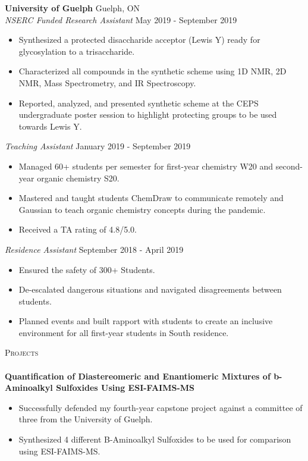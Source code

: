 \documentclass[a4paper]{article}
\newcommand{\lineunder} {
    \vspace*{-8pt} \\
    \hspace*{-18pt} \hrulefill \\
}
\newcommand{\header} [1] {
    {\hspace*{-18pt}\vspace*{6pt} \textsc{#1}}
    \vspace*{-6pt} \lineunder
}
\begin{document}
\textbf{University of Guelph} \hfill Guelph, ON\\
\textit{NSERC Funded Research Assistant} \hfill May 2019 - September 2019\\
\vspace{-1mm}
\begin{itemize} \itemsep 1pt
	\item Synthesized a protected disaccharide acceptor (Lewis Y)          ready for glycosylation to a trisaccharide.
	\item Characterized all compounds in the synthetic scheme using        1D NMR, 2D NMR, Mass Spectrometry, and IR Spectroscopy.
        \item Reported, analyzed, and presented synthetic scheme at the CEPS undergraduate poster session to highlight protecting groups to be used towards Lewis Y.
\end{itemize}

\textit{Teaching Assistant} \hfill January 2019 - September 2019\\
\vspace{-1mm}
\begin{itemize} \itemsep 1pt
	\item Managed 60+ students per semester for first-year chemistry       W20 and second-year organic chemistry S20. 
        \item Mastered and taught students ChemDraw to communicate remotely and Gaussian to teach organic chemistry concepts during the pandemic.
	\item Received a TA rating of 4.8/5.0.
\end{itemize}

\textit{Residence Assistant} \hfill September 2018 - April 2019\\
\vspace{-1mm}
\begin{itemize} \itemsep 1pt
	\item Ensured the safety of 300+ Students.
	\item De-escalated dangerous situations and navigated                  disagreements between students.
        \item Planned events and built rapport with students to create an inclusive environment for all first-year students in South residence.
\end{itemize}


\header{Projects}

{\textbf{Quantification of Diastereomeric and Enantiomeric Mixtures of b-Aminoalkyl Sulfoxides Using ESI-FAIMS-MS}} \\
\vspace{-1mm}
\begin{itemize} \itemsep 1pt
	\item Successfully defended my fourth-year capstone project            against a committee of three from the University of Guelph.
	\item Synthesized 4 different B-Aminoalkyl Sulfoxides to be used       for comparison using ESI-FAIMS-MS.
\end{itemize}
\vspace*{1mm}
\end{document}
